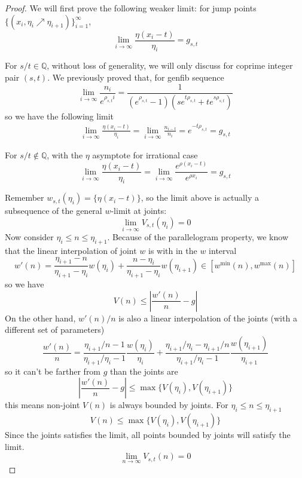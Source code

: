\documentclass[]{article}
\begin{document}
\begin{proof}
	We will first prove the following weaker limit: for jump points $\{(x_i, \eta_i\nearrow\eta_{i+1})\}_{i=1}^\infty$, 
	\[
	\lim_{i\to\infty} \frac{\eta(x_i - t)}{\eta_i} = g_{s,t}
	\]
	
	For $s/t\in\mathbb{Q}$, without loss of generality, we will only discuss for coprime integer pair $(s, t)$. We previously proved that, for genfib sequence
	\[
	\lim_{i\to\infty}    \frac{n_i}{e^{\rho_{s,t} i}} = \frac{1}{( e^{\rho_{s,t}} - 1)(s e^{t\rho_{s,t}} + t e^{s\rho_{s,t}})}
	\]
	so we have the following limit
	\begin{align*}
	\lim_{i\to\infty} \frac{\eta(x_i - t)}{\eta_i} = \lim_{i\to\infty} \frac{n_{i-t}}{n_i}= e^{-t\rho_{s,t}}	= g_{s,t}
	\end{align*}
	
	For $s/t\notin\mathbb{Q}$, with the $\eta$ asymptote for irrational case
	\[
	\lim_{i\to\infty} \frac{\eta(x_i - t)}{\eta_i} = \lim_{i\to\infty} \frac{e^{\rho(x_i-t)}}{e^{\rho x_i}}  = g_{s,t}
	\]
	
	Remember $w_{s,t}(\eta_i) = \{\eta(x_i - t)\}$, so the limit above is actually a subsequence of the general $w$-limit at joints:
	\[
	\lim_{i\to\infty} V_{s,t}(\eta_i) = 0
	\]
	Now consider $\eta_i\le n \le \eta_{i+1}$. Because of the parallelogram property, we know that the linear interpolation of joint $w$ is with in the $w$ interval 
	\[
		w'(n) = \frac{\eta_{i+1} - n}{\eta_{i+1} - \eta_{i}} w(\eta_i) + \frac{n - \eta_{i}}{\eta_{i+1} - \eta_{i}} w(\eta_{i+1}) \in [w^{\min}(n), w^{\max}(n)]
	\]
	so we have
	\[
	V(n) \le \left|\frac{w'(n)}{n} - g\right|
	\]
	On the other hand, $w'(n)/n$ is also a linear interpolation of the joints (with a different set of parameters)
	\[
	\frac{w'(n)}{n} = \frac{\eta_{i+1}/n-1}{\eta_{i+1}/\eta_i-1} \frac{w(\eta_i)}{\eta_i} + \frac{\eta_{i+1}/\eta_i - \eta_{i+1}/n}{\eta_{i+1}/\eta_i-1} \frac{w(\eta_{i+1})}{\eta_{i+1}}
	\]
	so it can't be farther from $g$ than the joints are
	\[
	\left|\frac{w'(n)}{n} - g\right| \le \max\{ V(\eta_i), V(\eta_{i+1}) \}
	\]
	this means non-joint $V(n)$ is always bounded by joints. For $\eta_i\le n \le \eta_{i+1}$
	\[
	V(n) \le \max\{ V(\eta_i), V(\eta_{i+1}) \}
	\]
	Since the joints satisfies the limit, all points bounded by joints will satisfy the limit.
	\[
	\lim_{n\to\infty} V_{s,t}(n) = 0
	\]
\end{proof}
\end{document}
